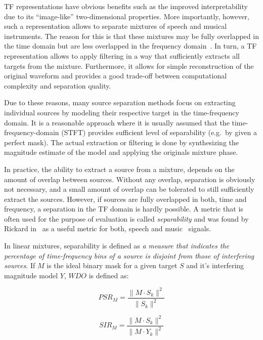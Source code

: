 TF representations have obvious benefits such as the improved interpretability due to its ``image-like'' two-dimensional properties.
More importantly, however, such a representation allows to separate mixtures of speech and musical instruments.
The reason for this is that these mixtures may be fully overlapped in the time domain but are less overlapped in the frequency domain~\cite{rickard02, giannoulis11, rafii}.
In turn, a TF representation allows to apply filtering in a way that sufficiently extracts all targets from the mixture.
Furthermore, it allows for simple reconstruction of the original waveform and provides a good trade-off between computational complexity and separation quality.
\par
Due to these reasons, many source separation methods focus on extracting individual sources by modeling their respective target in the time-frequency domain.
It is a reasonable approach where it is usually assumed that the time-frequency-domain (STFT) provides sufficient level of separability (e.g.~by given a perfect mask).
The actual extraction or filtering is done by synthesizing the magnitude estimate of the model and applying the originals mixture phase.
\par
In practice, the ability to extract a source from a mixture, depends on the amount of overlap between sources.
Without any overlap, separation is obviously not necessary, and a small amount of overlap can be tolerated to still sufficiently extract the sources.
However, if sources are fully overlapped in both, time and frequency, a separation in the TF domain is hardly possible.
A metric that is often used for the purpose of evaluation is called \emph{separability} and was found by Rickard in~\cite{rickard02} as a useful metric for both, speech and music~\cite{giannoulis11} signals.
\par
In linear mixtures, separability is defined as \emph{a measure that indicates the percentage of time-frequency bins of a source is disjoint from those of interfering sources}.
If \(M\) is the ideal binary mask for a given target \(S\) and it's interfering
magnitude model \(Y\), \(WDO\) is defined as:

\begin{equation}
    PSR_{M} = \frac{\|M \cdot S_{k}\|^{2}}{\|S_{k}\|^{2}}
\end{equation}

\begin{equation}
    SIR_{M}=\frac{\|M \cdot S_{k}\|^{2}}{\|M \cdot Y_{k}\|^{2}}
\end{equation}


